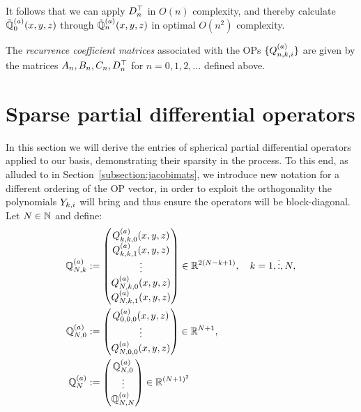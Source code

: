 \documentclass[11pt, oneside]{article}   	%
\begin{document}
It follows that we can apply $D^\top_n$ in $O(n)$ complexity, and thereby calculate $\mathbb{\tilde{Q}}^{(a)}_{0}(x,y,z)$  through $\mathbb{\tilde{Q}}^{(a)}_{n}(x,y,z)$ in optimal $O(n^2)$ complexity. 

\begin{definition}\label{def:clenshawmats}
	The \textit{recurrence coefficient matrices} associated with the OPs $\{Q_{n,k,i}^{(a)}\}$ are given by the matrices $A_n, B_n, C_n, D^\top_n$ for $n = 0,1,2,\dots$ defined above.
\end{definition}


%
\section{Sparse partial differential operators}\label{Section:PDOs}

In this section we will derive the entries of spherical partial differential operators applied to our basis, demonstrating their sparsity in the process. To this end, as alluded to in Section~\ref{subsection:jacobimats}, we introduce new notation for a different ordering of the OP vector, in order to exploit the orthogonality the polynomials $Y_{k,i}$ will bring and thus ensure the operators will be block-diagonal. Let $N \in \mathbb{N}$ and define:
\begin{align}
	{\mathbb{Q}}^{(a)}_{N,k} &:= 
		\begin{pmatrix}
			Q^{(a)}_{k,k,0}(x,y,z) \\
			Q^{(a)}_{k,k,1}(x,y,z) \\
			\vdots \\
			Q^{(a)}_{N,k,0}(x,y,z) \\
			Q^{(a)}_{N,k,1}(x,y,z)
		\end{pmatrix} \in \mathbb{R}^{2(N-k+1)},  \quad k = 1,\vdots,N, \label{eqn:OPdefNka} \\ 
	{\mathbb{Q}}^{(a)}_{N,0} &:= 
		\begin{pmatrix}
			Q^{(a)}_{0,0,0}(x,y,z) \\
			\vdots \\
			Q^{(a)}_{N,0,0}(x,y,z) \\
		\end{pmatrix} \in \mathbb{R}^{N+1}, \label{eqn:OPdefN0a} \\
	{\mathbb{Q}}^{(a)}_{N} &:= 
		\begin{pmatrix}
			{\mathbb{Q}}^{(a)}_{N,0} \\
			\vdots \\
			{\mathbb{Q}}^{(a)}_{N,N}
		\end{pmatrix} \in \mathbb{R}^{(N+1)^2} \label{eqn:OPdefNa}
\end{align}
\end{document}
